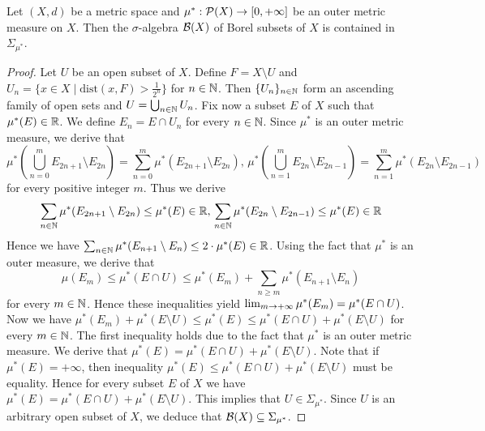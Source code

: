 \begin{theorem}
Let $(X,d)$ be a metric space and $\mu^*:{\mathcal P}(X)\rightarrow [0,+\infty]$ be an outer metric measure on $X$. Then the $\sigma$-algebra ${\mathcal B}(X)$ of Borel subsets of $X$ is contained in $\Sigma_{\mu^*}$.
\end{theorem}
\begin{proof}
Let $U$ be an open subset of $X$. Define $F=X\setminus U$ and $U_n=\{x\in X\mid \mathrm{dist}(x,F)>\frac{1}{2^n}\}$ for $n\in {\mathbb N}$. Then $\{U_n\}_{n\in {\mathbb N}}$ form an ascending family of open sets and $U=\bigcup_{n\in {\mathbb N}}U_n$. Fix now a subset $E$ of $X$ such that $\mu^*(E)\in {\mathbb R}$. We define $E_n=E\cap U_n$ for every $n\in {\mathbb N}$. Since $\mu^*$ is an outer metric measure, we derive that
$$\mu^*\left(\bigcup_{n=0}^mE_{2n+1}\setminus E_{2n}\right)=\sum_{n=0}^m\mu^*(E_{2n+1}\setminus E_{2n}),\,\mu^*\left(\bigcup_{n=1}^mE_{2n}\setminus E_{2n-1}\right)=\sum_{n=1}^m\mu^*(E_{2n}\setminus E_{2n-1})$$
for every positive integer $m$. Thus we derive 
$$\sum_{n\in {\mathbb N}}\mu^*(E_{2n+1}\setminus E_{2n})\leq \mu^*(E)\in {\mathbb R},\,\sum_{n\in {\mathbb N}}\mu^*(E_{2n}\setminus E_{2n-1})\leq \mu^*(E)\in {\mathbb R}$$
Hence we have $\sum_{n\in {\mathbb N}}\mu^*(E_{n+1}\setminus E_{n})\leq 2\cdot \mu^*(E)\in {\mathbb R}$. Using the fact that $\mu^*$ is an outer measure, we derive that
$$\mu(E_m)\leq \mu^*(E\cap U)\leq \mu^*(E_m)+\sum_{n\geq m}\mu^*(E_{n+1}\setminus E_n)$$
for every $m\in {\mathbb N}$. Hence these inequalities yield $\lim_{m\rightarrow +\infty}\mu^*(E_m)=\mu^*(E\cap U)$. Now we have $\mu^*(E_m)+\mu^*(E\setminus U)\leq \mu^*(E)\leq \mu^*(E\cap U)+\mu^*(E\setminus U)$ for every $m\in {\mathbb N}$. The first inequality holds due to the fact that $\mu^*$ is an outer metric measure. We derive that $\mu^*(E)=\mu^*(E\cap U)+\mu^*(E\setminus U)$. Note that if $\mu^*(E)=+\infty$, then inequality $\mu^*(E)\leq \mu^*(E\cap U)+\mu^*(E\setminus U)$ must be equality. Hence for every subset $E$ of $X$ we have $\mu^*(E)=\mu^*(E\cap U)+\mu^*(E\setminus U)$. This implies that $U\in \Sigma_{\mu^*}$. Since $U$ is an arbitrary open subset of $X$, we deduce that ${\mathcal B}(X)\subseteq \Sigma_{\mu^*}$.
\end{proof}































































